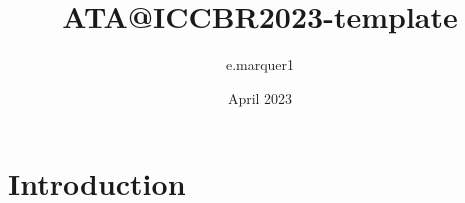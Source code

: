 \documentclass{article}
\title{ATA@ICCBR2023-template}
\author{e.marquer1 }
\date{April 2023}
\begin{document}
\maketitle

\section{Introduction}
\end{document}
